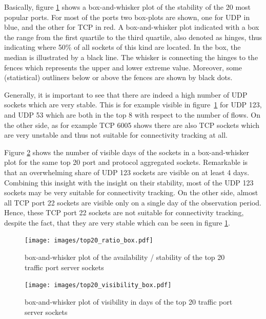 Basically, figure \ref{fig:top20_ratio_box} shows a box-and-whisker plot of the stability of the 20 most popular ports. 
For most of the ports two box-plots are shown, one for \gls{UDP} in blue, and the other for \gls{TCP} in red. 
A box-and-whisker plot indicated with a box the range from the first quartile to the third quartile, also denoted as hinges, thus indicating where 50\% of all sockets of this kind are located. 
In the box, the median is illustrated by a black line. 
The whisker is connecting the hinges to the fences which represents the upper and lower extreme value. 
Moreover, some (statistical) outliners below or above the fences are shown by black dots.

Generally, it is important to see that there are indeed a high number of UDP sockets which are very stable. This is for example visible in figure \ref{fig:top20_ratio_box} for UDP 123, and UDP 53 which are both in the top 8 with respect to the number of flows.
On the other side, as for example TCP 6005 shows there are also TCP sockets which are very unstable and thus not suitable for connectivity tracking at all. 


Figure \ref{fig:top20_visibledays_box} shows the number of visible days of the sockets in a box-and-whisker plot for the same top 20 port and protocol aggregated sockets. 
Remarkable is that an overwhelming share of UDP 123 sockets are visible on at least 4 days. 
Combining this insight with the insight on their stability, most of the UDP 123 sockets may be very suitable for connectivity tracking. 
On the other side, almost all TCP port 22 sockets are visible only on a single day of the observation period. 
Hence, these TCP port 22 sockets are not suitable for connectivity tracking, despite the fact, that they are very stable which can be seen in figure \ref{fig:top20_ratio_box}.


\begin{landscape}
	\begin{figure}
		[p] \centering 
		\texttt{[image: images/top20\_ratio\_box.pdf]} \caption{box-and-whisker plot of the availability / stability of the top 20 traffic port server sockets} 
		\label{fig:top20_ratio_box} 
	\end{figure}
\end{landscape}
\begin{landscape}
	\begin{figure}
		[p] \centering 
		\texttt{[image: images/top20\_visibility\_box.pdf]} \caption{box-and-whisker plot of visibility in days of the top 20 traffic port server sockets} 
		\label{fig:top20_visibledays_box} 
	\end{figure}
\end{landscape}

